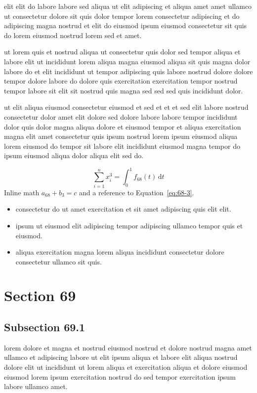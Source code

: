 \documentclass{article}
\begin{document}
elit elit do labore labore sed aliqua ut elit adipiscing et aliqua amet amet ullamco ut consectetur dolore sit quis dolor tempor lorem consectetur adipiscing et do adipiscing magna nostrud et elit do eiusmod ipsum eiusmod consectetur sit quis do lorem eiusmod nostrud lorem sed et amet.

ut lorem quis et nostrud aliqua ut consectetur quis dolor sed tempor aliqua et labore elit ut incididunt lorem aliqua magna eiusmod aliqua sit quis magna dolor labore do et elit incididunt ut tempor adipiscing quis labore nostrud dolore dolore tempor dolore labore do dolore quis exercitation exercitation tempor nostrud tempor labore sit elit sit nostrud quis magna sed sed sed quis incididunt dolor.

ut elit aliqua eiusmod consectetur eiusmod et sed et et et sed elit labore nostrud consectetur dolor amet elit dolore sed dolore labore labore tempor incididunt dolor quis dolor magna aliqua dolore et eiusmod tempor et aliqua exercitation magna elit amet consectetur quis ipsum nostrud lorem ipsum eiusmod aliqua lorem eiusmod do tempor sit labore elit incididunt eiusmod magna tempor do ipsum eiusmod aliqua dolor aliqua elit sed do.

\begin{equation}\label{eq:68-3}
  \sum_{i=1}^{n} x_i^{3} = \int_0^1 f_{68}(t)\,\mathrm{d}t
\end{equation}
Inline math $a_{68} + b_{3} = c$ and a reference to Equation~\eqref{eq:68-3}.

\begin{itemize}
  \item consectetur do ut amet exercitation et sit amet adipiscing quis elit elit.
  \item ipsum ut eiusmod elit adipiscing tempor adipiscing ullamco tempor quis et eiusmod.
  \item aliqua exercitation magna lorem aliqua incididunt consectetur dolore consectetur ullamco sit quis.
\end{itemize}

\section{Section 69}\label{sec:69}
\subsection{Subsection 69.1}\label{sec:69-1}
lorem dolore et magna et nostrud eiusmod nostrud et dolore nostrud magna amet ullamco et adipiscing labore ut elit ipsum aliqua et labore elit aliqua nostrud dolore elit ut incididunt ut lorem aliqua et exercitation aliqua et dolore eiusmod eiusmod lorem ipsum exercitation nostrud do sed tempor exercitation ipsum labore ullamco amet.
\end{document}
